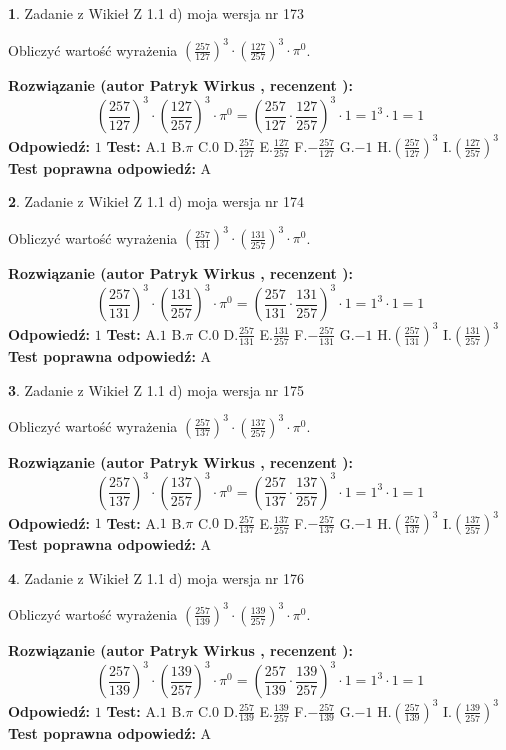 \documentclass[12pt, a4paper]{article}
\theoremstyle{definition} %
\newtheorem{zad}{}
\newcommand{\zadStart}[1]{\begin{zad}#1\newline}
\newcommand{\zadStop}{\end{zad}}
\newcommand{\rozwStart}[2]{\noindent \textbf{Rozwiązanie (autor #1 , recenzent #2): }\newline}
\newcommand{\rozwStop}{\newline}
\newcommand{\odpStart}{\noindent \textbf{Odpowiedź:}\newline}
\newcommand{\odpStop}{\newline}
\newcommand{\testStart}{\noindent \textbf{Test:}\newline}
\newcommand{\testStop}{\newline}
\newcommand{\kluczStart}{\noindent \textbf{Test poprawna odpowiedź:}\newline}
\newcommand{\kluczStop}{\newline}
\begin{document}
\zadStart{Zadanie z Wikieł Z 1.1 d) moja wersja nr 173}

Obliczyć wartość wyrażenia $(\frac{257}{127})^{3} \cdot (\frac{127}{257})^{3} \cdot \pi^{0}$.
\zadStop
\rozwStart{Patryk Wirkus}{}
$$(\frac{257}{127})^{3} \cdot (\frac{127}{257})^{3} \cdot \pi^{0} = (\frac{257}{127} \cdot \frac{127}{257})^{3} \cdot 1 = 1^{3} \cdot 1 = 1$$
\rozwStop
\odpStart
$1$
\odpStop
\testStart
A.$1$ B.$\pi$ C.$0$ D.$\frac{257}{127}$ E.$\frac{127}{257}$
F.$-\frac{257}{127}$ G.$-1$
H.$(\frac{257}{127})^{3}$
I.$(\frac{127}{257})^{3}$
\testStop
\kluczStart
A
\kluczStop



\zadStart{Zadanie z Wikieł Z 1.1 d) moja wersja nr 174}

Obliczyć wartość wyrażenia $(\frac{257}{131})^{3} \cdot (\frac{131}{257})^{3} \cdot \pi^{0}$.
\zadStop
\rozwStart{Patryk Wirkus}{}
$$(\frac{257}{131})^{3} \cdot (\frac{131}{257})^{3} \cdot \pi^{0} = (\frac{257}{131} \cdot \frac{131}{257})^{3} \cdot 1 = 1^{3} \cdot 1 = 1$$
\rozwStop
\odpStart
$1$
\odpStop
\testStart
A.$1$ B.$\pi$ C.$0$ D.$\frac{257}{131}$ E.$\frac{131}{257}$
F.$-\frac{257}{131}$ G.$-1$
H.$(\frac{257}{131})^{3}$
I.$(\frac{131}{257})^{3}$
\testStop
\kluczStart
A
\kluczStop



\zadStart{Zadanie z Wikieł Z 1.1 d) moja wersja nr 175}

Obliczyć wartość wyrażenia $(\frac{257}{137})^{3} \cdot (\frac{137}{257})^{3} \cdot \pi^{0}$.
\zadStop
\rozwStart{Patryk Wirkus}{}
$$(\frac{257}{137})^{3} \cdot (\frac{137}{257})^{3} \cdot \pi^{0} = (\frac{257}{137} \cdot \frac{137}{257})^{3} \cdot 1 = 1^{3} \cdot 1 = 1$$
\rozwStop
\odpStart
$1$
\odpStop
\testStart
A.$1$ B.$\pi$ C.$0$ D.$\frac{257}{137}$ E.$\frac{137}{257}$
F.$-\frac{257}{137}$ G.$-1$
H.$(\frac{257}{137})^{3}$
I.$(\frac{137}{257})^{3}$
\testStop
\kluczStart
A
\kluczStop



\zadStart{Zadanie z Wikieł Z 1.1 d) moja wersja nr 176}

Obliczyć wartość wyrażenia $(\frac{257}{139})^{3} \cdot (\frac{139}{257})^{3} \cdot \pi^{0}$.
\zadStop
\rozwStart{Patryk Wirkus}{}
$$(\frac{257}{139})^{3} \cdot (\frac{139}{257})^{3} \cdot \pi^{0} = (\frac{257}{139} \cdot \frac{139}{257})^{3} \cdot 1 = 1^{3} \cdot 1 = 1$$
\rozwStop
\odpStart
$1$
\odpStop
\testStart
A.$1$ B.$\pi$ C.$0$ D.$\frac{257}{139}$ E.$\frac{139}{257}$
F.$-\frac{257}{139}$ G.$-1$
H.$(\frac{257}{139})^{3}$
I.$(\frac{139}{257})^{3}$
\testStop
\kluczStart
A
\kluczStop
\end{document}
